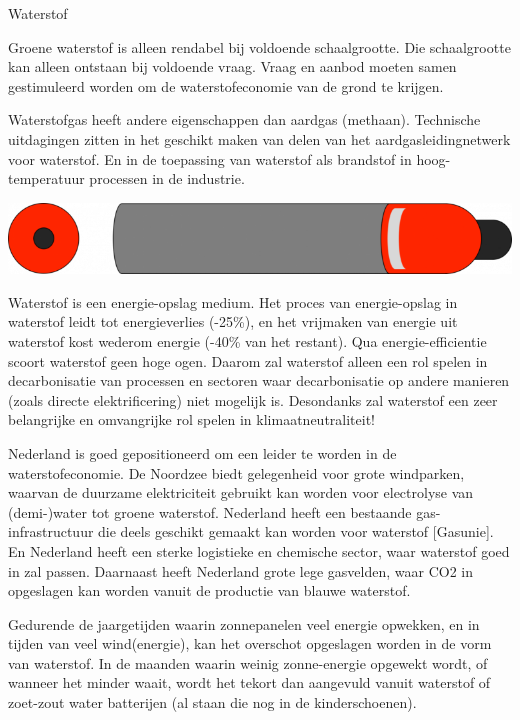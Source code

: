 \begin{voorstel}{Waterstof}
\begin{uitdaging}
Groene waterstof is alleen rendabel bij voldoende schaalgrootte. Die schaalgrootte kan alleen ontstaan bij voldoende vraag. Vraag en aanbod moeten samen gestimuleerd worden om de waterstofeconomie van de grond te krijgen.

Waterstofgas heeft andere eigenschappen dan aardgas (methaan). Technische uitdagingen zitten in het geschikt maken van delen van het aardgasleidingnetwerk voor waterstof. En in de toepassing van waterstof als brandstof in hoog-temperatuur processen in de industrie. 
\end{uitdaging}

\begin{overwegingen}
\includegraphics[width=.5\textwidth]{img/energie/waterstof-tank}

Waterstof is een energie-opslag medium. Het proces van energie-opslag in waterstof leidt tot energieverlies (-25\%), en het vrijmaken van energie uit waterstof kost wederom energie (-40\% van het restant). Qua energie-efficientie scoort waterstof geen hoge ogen. Daarom zal waterstof alleen een rol spelen in decarbonisatie van processen en sectoren waar decarbonisatie op andere manieren (zoals directe elektrificering) niet mogelijk is. Desondanks zal waterstof een zeer belangrijke en omvangrijke rol spelen in klimaatneutraliteit!

Nederland is goed gepositioneerd om een leider te worden in de waterstofeconomie. De Noordzee biedt gelegenheid voor grote windparken, waarvan de duurzame elektriciteit gebruikt kan worden voor electrolyse van (demi-)water tot groene waterstof. Nederland heeft een bestaande gas-infrastructuur die deels geschikt gemaakt kan worden voor waterstof [Gasunie]. En Nederland heeft een sterke logistieke en chemische sector, waar waterstof goed in zal passen. Daarnaast heeft Nederland grote lege gasvelden, waar CO2 in opgeslagen kan worden vanuit de productie van blauwe waterstof.

Gedurende de jaargetijden waarin zonnepanelen veel energie opwekken, en in tijden van veel wind(energie), kan het overschot opgeslagen worden in de vorm van waterstof. In de maanden waarin weinig zonne-energie opgewekt wordt, of wanneer het minder waait, wordt het tekort dan aangevuld vanuit waterstof of zoet-zout water batterijen (al staan die nog in de kinderschoenen).


\end{overwegingen}
\end{voorstel}
